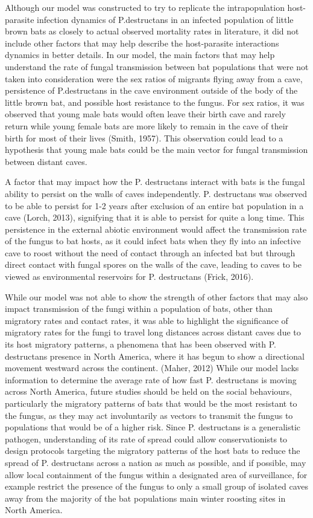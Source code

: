 \documentclass[12pt]{article}
\begin{document}
Although our model was constructed to try to replicate the intrapopulation host-parasite infection dynamics of P.destructans in an infected population of little brown bats as closely to actual observed mortality rates in literature, it did not include other factors that may help describe the host-parasite interactions dynamics in better details. In our model, the main factors that may help understand the rate of fungal transmission between bat populations that were not taken into consideration were the sex ratios of migrants flying away from a cave, persistence of P.destructans in the cave environment outside of the body of the little brown bat, and possible host resistance to the fungus. 
For sex ratios, it was observed that young male bats would often leave their birth cave and rarely return while young female bats are more likely to remain in the cave of their birth for most of their lives (Smith, 1957). This observation could lead to a hypothesis that young male bats could be the main vector for fungal transmission between distant caves.

A factor that may impact how the P. destructans interact with bats is the fungal ability to persist on the walls of caves independently. P. destructans was observed to be able to persist for 1-2 years after exclusion of an entire bat population in a cave (Lorch, 2013), signifying that it is able to persist for quite a long time. This persistence in the external abiotic environment would affect the transmission rate of the fungus to bat hosts, as it could infect bats when they fly into an infective cave to roost without the need of contact through an infected bat but through direct contact with fungal spores on the walls of the cave, leading to caves to be viewed as environmental reservoirs for P. destructans (Frick, 2016).  

While our model was not able to show the strength of other factors that may also impact transmission of the fungi within a population of bats, other than migratory rates and contact rates, it was able to highlight the significance of migratory rates for the fungi to travel long distances across distant caves due to its host migratory patterns, a phenomena that has been observed with P. destructans presence in North America, where it has begun to show a directional movement westward across the continent. (Maher, 2012) While our model lacks information to determine the average rate of how fast P. destructans is moving across North America, future studies should be held on the social behaviours, particularly the migratory patterns of bats that would be the most resistant to the fungus, as they may act involuntarily as vectors to transmit the fungus to populations that would be of a higher risk. Since P. destructans is a generalistic pathogen, understanding of its rate of spread could allow conservationists to design protocols targeting the migratory patterns of the host bats to reduce the spread of P. destructans across a nation as much as possible, and if possible, may allow local containment of the fungus within a designated area of surveillance, for example restrict the presence of the fungus to only a small group of isolated caves away from the majority of the bat populations main winter roosting sites in North America.  
\end{document}
